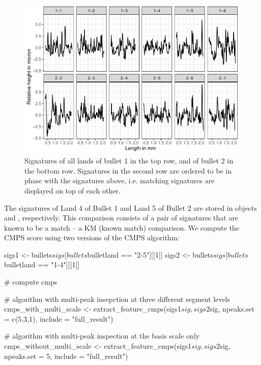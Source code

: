 \begin{Schunk}
\begin{figure}

{\centering \includegraphics[width=\textwidth]{ju-hofmann_files/figure-latex/sigs-1} 

}

\caption[Signatures of all lands of bullet 1 in the top row, and of bullet 2 in the bottom row]{Signatures of all lands of bullet 1 in the top row, and of bullet 2 in the bottom row. Signatures in the second row are ordered to be in phase with the signatures above, i.e. matching signatures are displayed on top of each other.}\label{fig:sigs}
\end{figure}
\end{Schunk}

The signatures of Land 4 of Bullet 1 and Land 5 of Bullet 2 are stored
in objects  and , respectively. This comparison
consists of a pair of signatures that are known to be a match -- a KM
(known match) comparison. We compute the CMPS score using two versions
of the CMPS algorithm:

\begin{Schunk}
\begin{Sinput}
sigs1 <- bullets$sigs[bullets$bulletland == "2-5"][[1]]
sigs2 <- bullets$sigs[bullets$bulletland == "1-4"][[1]]

# compute cmps

# algorithm with multi-peak insepction at three different segment levels
cmps_with_multi_scale <- 
  extract_feature_cmps(sigs1$sig, sigs2$sig, 
                       npeaks.set = c(5,3,1), include = "full_result")

# algorithm with multi-peak inspection at the basis scale only
cmps_without_multi_scale <- 
  extract_feature_cmps(sigs1$sig, sigs2$sig, 
                       npeaks.set = 5, include = "full_result")
\end{Sinput}
\end{Schunk}

